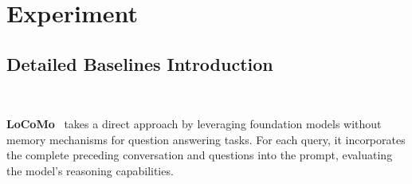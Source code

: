 \documentclass{article}
\begin{document}

\section{Experiment}
\subsection{Detailed Baselines Introduction}~\label{app:baselines}

\noindent \textbf{LoCoMo}~\cite{locomo} takes a direct approach by leveraging foundation models without memory mechanisms for question answering tasks. For each query, it incorporates the complete preceding conversation and questions into the prompt, evaluating the model's reasoning capabilities.
\end{document}
